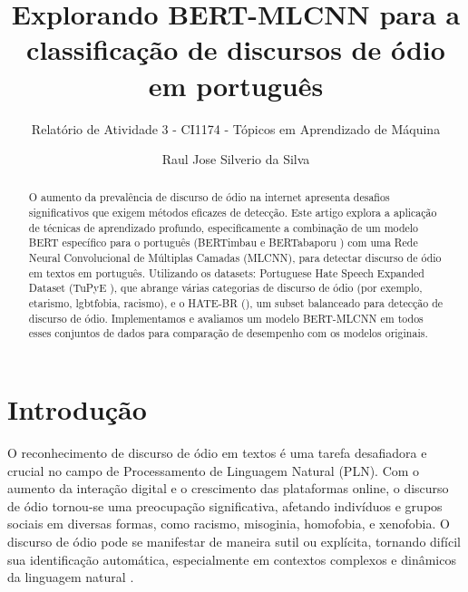 \documentclass[sigconf,nonacm]{acmart}
\begin{document}
\title{Explorando BERT-MLCNN para a classificação de discursos de ódio em português}
\subtitle{Relatório de Atividade 3 - CI1174 - Tópicos em Aprendizado de Máquina}

\author{Raul Jose Silverio da Silva}

\begin{abstract}
  O aumento da prevalência de discurso de ódio na internet apresenta desafios significativos que exigem métodos eficazes de detecção. 
  Este artigo explora a aplicação de técnicas de aprendizado profundo, especificamente a combinação de um modelo BERT específico para o 
  português (BERTimbau \cite{souza2020bertimbau} e BERTabaporu \cite{costa-etal-2023-bertabaporu}) com uma Rede Neural Convolucional de Múltiplas Camadas (MLCNN), 
  para detectar discurso de ódio em textos em português. 
  Utilizando os datasets: Portuguese Hate Speech Expanded Dataset (TuPyE \cite{oliveira2023tupye}), que abrange várias categorias de discurso de ódio 
  (por exemplo, etarismo, lgbtfobia, racismo), e o HATE-BR (\cite{vargas-etal-2022-hatebr}), um subset balanceado para detecção de discurso de ódio. 
  Implementamos e avaliamos um modelo BERT-MLCNN \cite{ATANDOH2023101578} em todos esses conjuntos de dados para comparação de desempenho com os modelos originais.
\end{abstract}


\maketitle

\section{Introdução}

O reconhecimento de discurso de ódio em textos é uma tarefa desafiadora e crucial no campo de Processamento de Linguagem Natural (PLN). 
Com o aumento da interação digital e o crescimento das plataformas online, o discurso de ódio tornou-se uma preocupação significativa, 
afetando indivíduos e grupos sociais em diversas formas, como racismo, misoginia, homofobia, e xenofobia. 
O discurso de ódio pode se manifestar de maneira sutil ou explícita, tornando difícil sua identificação automática, 
especialmente em contextos complexos e dinâmicos da linguagem natural \cite{schmidt-wiegand-2017-survey}.
\end{document}
